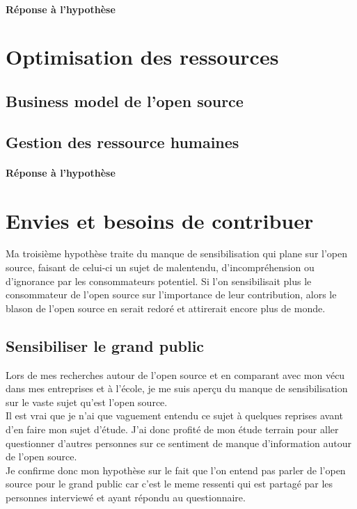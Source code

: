 \paragraph{Réponse à l'hypothèse}

\section{Optimisation des ressources}

	\subsection{Business model de l'open source}

	\subsection{Gestion des ressource humaines}

\paragraph{Réponse à l'hypothèse}

\section{Envies et besoins de contribuer}

	Ma troisième hypothèse traite du manque de sensibilisation qui plane sur l'open source, faisant de celui-ci un sujet de malentendu, d'incompréhension ou d'ignorance par les consommateurs potentiel. Si l'on sensibilisait plus le consommateur de l'open source sur l'importance de leur contribution, alors le blason de l'open source en serait redoré et attirerait encore plus de monde.

\subsection{Sensibiliser le grand public}

	Lors de mes recherches autour de l'open source et en comparant avec mon vécu dans mes entreprises et à l'école, je me suis aperçu du manque de sensibilisation sur le vaste sujet qu'est l'open source.\\

	Il est vrai que je n'ai que vaguement entendu ce sujet à quelques reprises avant d'en faire mon sujet d'étude.
	J'ai donc profité de mon étude terrain pour aller questionner d'autres personnes sur ce sentiment de manque d'information autour de l'open source.\\
	Je confirme donc mon hypothèse sur le fait que l'on entend pas parler de l'open source pour le grand public car c'est le meme ressenti qui est partagé par les personnes interviewé et ayant répondu au questionnaire.\\

